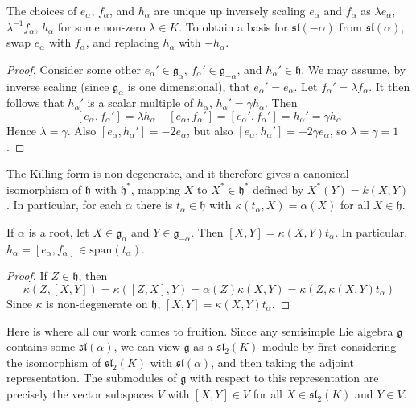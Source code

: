 \begin{theorem}
    The choices of $e_\alpha$, $f_\alpha$, and $h_\alpha$ are unique up inversely scaling $e_\alpha$ and $f_\alpha$ as $\lambda e_\alpha$, $\lambda^{-1} f_\alpha$, $h_\alpha$ for some non-zero $\lambda \in K$. To obtain a basis for $\mathfrak{sl}(-\alpha)$ from $\mathfrak{sl}(\alpha)$, swap $e_\alpha$ with $f_\alpha$, and replacing $h_\alpha$ with $-h_\alpha$.
\end{theorem}
\begin{proof}
    Consider some other $e_\alpha' \in \mathfrak{g}_\alpha$, $f_\alpha' \in \mathfrak{g}_{-\alpha}$, and $h_\alpha' \in \mathfrak{h}$. We may assume, by inverse scaling (since $\mathfrak{g}_\alpha$ is one dimensional), that $e_\alpha' = e_\alpha$. Let $f_\alpha' = \lambda f_\alpha$. It then follows that $h_\alpha'$ is a scalar multiple of $h_\alpha$, $h_\alpha' = \gamma h_\alpha$. Then
    \[ [e_\alpha, f_\alpha'] = \lambda h_\alpha\ \ \ \ \ [e_\alpha, f_\alpha'] = [e_\alpha', f_\alpha'] = h_\alpha' = \gamma h_\alpha \]
    Hence $\lambda = \gamma$. Also $[e_\alpha, h_\alpha'] = - 2e_\alpha$, but also $[e_\alpha, h_\alpha'] = - 2 \gamma e_\alpha$, so $\lambda = \gamma = 1$.
\end{proof}

The Killing form is non-degenerate, and it therefore gives a canonical isomorphism of $\mathfrak{h}$ with $\mathfrak{h}^*$, mapping $X$ to $X^* \in \mathfrak{h}^*$ defined by $X^*(Y) = k(X,Y)$. In particular, for each $\alpha$ there is $t_\alpha \in \mathfrak{h}$ with $\kappa(t_\alpha,X) = \alpha(X)$ for all $X \in \mathfrak{h}$.

\begin{lemma}
    If $\alpha$ is a root, let $X \in \mathfrak{g}_\alpha$ and $Y \in \mathfrak{g}_{-\alpha}$. Then $[X,Y] = \kappa(X,Y) t_\alpha$. In particular, $h_\alpha = [e_\alpha, f_\alpha] \in \text{span}(t_\alpha)$.
\end{lemma}
\begin{proof}
    If $Z \in \mathfrak{h}$, then
    \[ \kappa(Z,[X,Y]) = \kappa([Z,X],Y) = \alpha(Z) \kappa(X,Y) = \kappa(Z, \kappa(X,Y) t_\alpha) \]
    Since $\kappa$ is non-degenerate on $\mathfrak{h}$, $[X,Y] = \kappa(X,Y) t_\alpha$.
\end{proof}

Here is where all our work comes to fruition. Since any semisimple Lie algebra $\mathfrak{g}$ contains some $\mathfrak{sl}(\alpha)$, we can view $\mathfrak{g}$ as a $\mathfrak{sl}_2(K)$ module by first considering the isomorphism of $\mathfrak{sl}_2(K)$ with $\mathfrak{sl}(\alpha)$, and then taking the adjoint representation. The submodules of $\mathfrak{g}$ with respect to this representation are precisely the vector subspaces $V$ with $[X,Y] \in V$ for all $X \in \mathfrak{sl}_2(K)$ and $Y \in V$.

